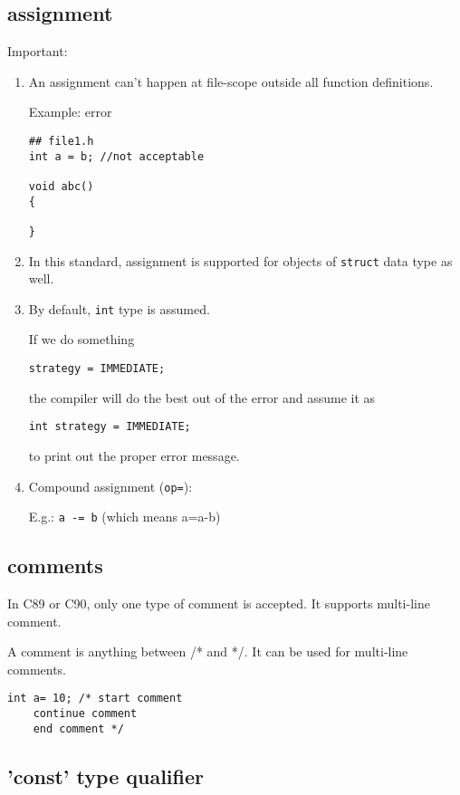 \subsection{assignment}
\label{sec:assignment-in-C}

Important:
\begin{enumerate}
  \item  An assignment can't happen at file-scope outside all function
  definitions. 

Example: error
\begin{verbatim}
## file1.h
int a = b; //not acceptable

void abc()
{

}
\end{verbatim}

  
  \item In this standard, assignment is supported for objects of \verb!struct!
  data type as well.

  \item By default, \verb!int! type is assumed.

If we do something
\begin{lstlisting}
strategy = IMMEDIATE;
\end{lstlisting}
the compiler will do the best out of the error and assume it as
\begin{verbatim}
int strategy = IMMEDIATE;
\end{verbatim}
to print out the proper error message.

  \item Compound assignment (\verb!op=!): 
  
E.g.: \verb!a -= b! (which means a=a-b)
\end{enumerate}



\subsection{comments}
\label{sec:comment_C89}

In C89 or C90, only one type of comment is accepted. It supports multi-line
comment.  

A comment is anything between /* and */. It can be used for multi-line comments.
\begin{lstlisting}
int a= 10; /* start comment
    continue comment
    end comment */
\end{lstlisting}

\subsection{'const' type qualifier}
\label{sec:const_C}

